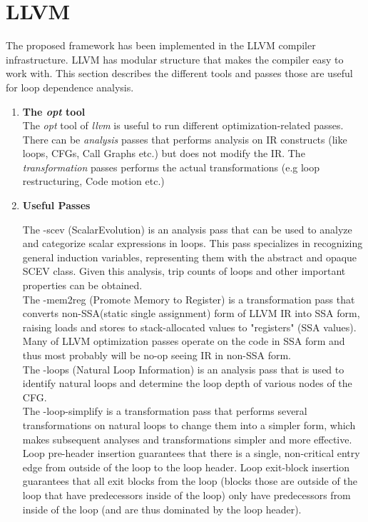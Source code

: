 \documentclass[10pt]{report}          %
\begin{document}
\section{LLVM}
\label{sec:llvm}

The proposed framework has been implemented in the LLVM compiler infrastructure.  LLVM has modular structure that makes the compiler easy to work with.  This section describes the different tools and passes those are useful for loop dependence analysis.

\begin{enumerate}

\item \textbf{The \textit{opt} tool}\\

The \textit{opt} tool of \textit{llvm} is useful to run different optimization-related passes.  There can be \textit{analysis} passes that performs analysis on IR constructs (like loops, CFGs, Call Graphs etc.) but does not modify the IR. The \textit{transformation} passes performs the actual transformations (e.g loop restructuring, Code motion etc.)

\item \textbf{Useful Passes}

The -scev (ScalarEvolution) is an analysis pass that can be used to analyze and categorize scalar expressions in loops.  This pass specializes in recognizing general induction variables, representing them with the abstract and opaque
SCEV class.  Given this analysis, trip counts of loops and other important properties can be obtained. \\

The -mem2reg (Promote Memory to Register) is a transformation pass that converts non-SSA(static single assignment) form of LLVM IR into SSA form, raising loads and stores to stack-allocated values to "registers" (SSA values). Many of LLVM optimization passes operate on the code in SSA form and thus most probably will be no-op seeing IR in non-SSA form.\\

The -loops (Natural Loop Information) is an analysis pass that is used to identify natural loops and determine the loop depth of various nodes of the CFG.\\

The -loop-simplify is a transformation pass that performs several transformations on natural loops to change them into a simpler form, which makes subsequent analyses and transformations simpler and more effective. Loop pre-header insertion guarantees that there is a single, non-critical entry edge from outside of the loop to the loop header.  Loop exit-block insertion guarantees that all exit blocks from the loop (blocks those are outside of the loop that have predecessors inside of the loop) only have predecessors from inside of the loop (and are thus dominated by the loop header). \\


\end{enumerate}
\end{document}
